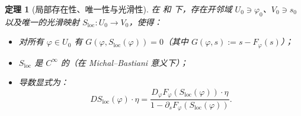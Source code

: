 \documentclass[12pt,a4paper]{article}
\newtheorem{theorem}{定理}[section]
\theoremstyle{definition}
\begin{document}
\begin{theorem}[局部存在性、唯一性与光滑性]
\label{thm:p3}
在 和 下，存在开邻域 $U_0 \ni \varphi_0$、$V_0 \ni s_0$ 以及唯一的光滑映射 $S_{\mathrm{loc}}: U_0 \to V_0$，使得：
\begin{itemize}
\item[(C1)] 对所有 $\varphi \in U_0$ 有 $G(\varphi, S_{\mathrm{loc}}(\varphi)) = 0$（其中 $G(\varphi, s) := s - F_\varphi(s)$）；
\item[(C2)] $S_{\mathrm{loc}}$ 是 $C^\infty$ 的（在 Michal--Bastiani 意义下）；
\item[(C3)] 导数显式为：
\begin{equation}
DS_{\mathrm{loc}}(\varphi) \cdot \eta = \frac{D_\varphi F_\varphi(S_{\mathrm{loc}}(\varphi)) \cdot \eta}{1 - \partial_s F_\varphi(S_{\mathrm{loc}}(\varphi))}.
\label{eq:explicit-deriv}
\end{equation}
\end{itemize}
\end{theorem}
\end{document}
